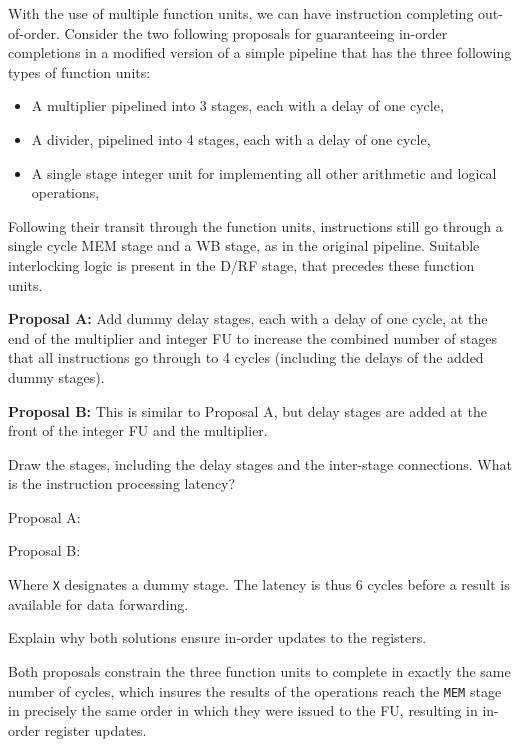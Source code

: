 \documentclass[12pt,letterpaper]{hmcpset}
\begin{document}
\begin{problem}[3]
With the use of multiple function units, we can have instruction completing out-of-order.  Consider the two following proposals for guaranteeing in-order completions in a modified version of a simple pipeline that has the three following types of function units:
\begin{itemize}
\item A multiplier pipelined into 3 stages, each with a delay of one cycle,
\item A divider,  pipelined into 4 stages, each with a delay of one cycle,
\item A single stage integer unit for implementing all other arithmetic and logical operations,
\end{itemize}
Following their transit through the function units, instructions still go through a single cycle MEM stage and a WB stage, as in the original pipeline.  Suitable interlocking logic is present in the D/RF stage, that precedes these function units.

\textbf{Proposal A:} Add dummy delay stages, each with a delay of one cycle, at the end of the multiplier and integer FU to increase the combined number of stages that all instructions go through to 4 cycles (including the delays of the added dummy stages).

\textbf{Proposal B:} This is similar to Proposal A, but delay stages are added at the front of the integer FU and the multiplier.
\end{problem}

\begin{problem}[3a]
Draw the stages, including the delay stages and the inter-stage connections.  What is the instruction processing latency?
\end{problem}

\begin{solution}
Proposal A:


Proposal B:


Where \texttt{X} designates a dummy stage.  The latency is thus 6 cycles before a result is available for data forwarding.
\end{solution}

\begin{problem}[3b]
Explain why both solutions ensure in-order updates to the registers.
\end{problem}

\begin{solution}
Both proposals constrain the three function units to complete in exactly the same number of cycles, which insures the results of the operations reach the \texttt{MEM} stage in precisely the same order in which they were issued to the FU, resulting in in-order register updates.
\end{solution}
\end{document}
